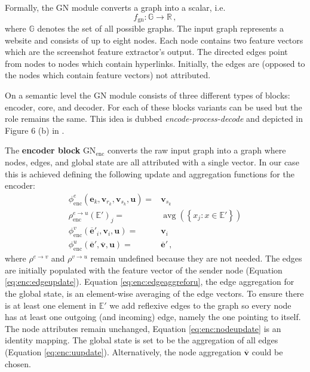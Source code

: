 Formally, the GN module converts a graph into a scalar, i.e. \begin{equation}
    \label{eq:gnmodule}
    f_\text{gn}:\mathbb{G}\rightarrow\mathbb{R}\,,
\end{equation} where $\mathbb{G}$ denotes the set of all possible graphs. The input graph represents a website and consists of up to eight nodes. Each node contains two feature vectors which are the screenshot feature extractor's output. The directed edges point from nodes to nodes which contain hyperlinks. Initially, the edges are (opposed to the nodes which contain feature vectors) not attributed.

On a semantic level the GN module consists of three different types of blocks: encoder, core, and decoder. For each of these blocks variants can be used but the role remains the same. This idea is dubbed \textit{encode-process-decode} and depicted in Figure 6 (b) in \cite{deepmind:graphnets}.

The \textbf{encoder block} $\text{GN}_\text{enc}$ converts the raw input graph into a graph where nodes, edges, and global state are all attributed with a single vector. In our case this is achieved defining the following update and aggregation functions for the encoder:\begin{align}
    \phi^e_\text{enc}\left(\bm{e}_k,\bm{v}_{r_k},\bm{v}_{s_k},\bm{u}\right)=&\bm{v}_{s_k}\label{eq:enc:edgeupdate}\\
    \rho^{e\rightarrow u}_\text{enc}\left(\mathbb{E}'\right)_j=&\operatorname{avg}\left(\left\{x_j:x\in\mathbb{E}'\right\}\right)\label{eq:enc:edgeaggreforu}\\
    \phi^v_\text{enc}\left(\bm{\overline{e}}'_i,\bm{v}_i,\bm{u}\right)=&\bm{v}_i\label{eq:enc:nodeupdate}\\
    \phi^u_\text{enc}\left(\bm{\overline{e}}',\bm{\overline{v}},\bm{u}\right)=&\bm{\overline{e}}'\label{eq:enc:uupdate}\,,
\end{align}where $\rho^{e\rightarrow v}$ and $\rho^{v\rightarrow u}$ remain undefined because they are not needed. The edges are initially populated with the feature vector of the sender node (Equation \ref{eq:enc:edgeupdate}). Equation \ref{eq:enc:edgeaggreforu}, the edge aggregation for the global state, is an element-wise averaging of the edge vectors. To ensure there is at least one element in $\mathbb{E}'$ we add reflexive edges to the graph so every node has at least one outgoing (and incoming) edge, namely the one pointing to itself. The node attributes remain unchanged, Equation \ref{eq:enc:nodeupdate} is an identity mapping. The global state is set to be the aggregation of all edges (Equation \ref{eq:enc:uupdate}). Alternatively, the node aggregation $\bm{\overline{v}}$ could be chosen.

